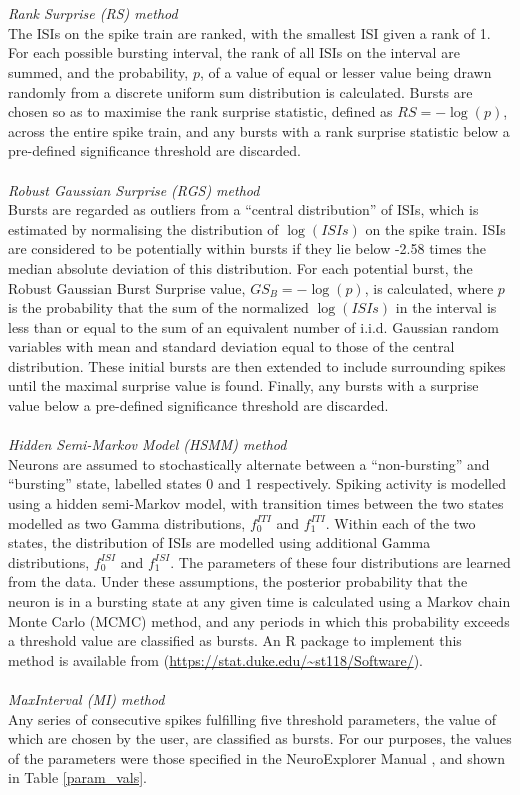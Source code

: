 \documentclass[12pt, titlepage]{article}
\begin{document}
	\\ \\ \textit{Rank Surprise (RS) method \cite{Gourevitch2007}}
	\\The ISIs on the spike train are ranked,  with the smallest ISI given a rank of 1. For each possible bursting interval, the rank of all ISIs on the interval are summed, and the probability, $p$, of a value of equal or lesser value  being drawn randomly from a discrete uniform sum distribution is calculated. Bursts are chosen so as to maximise the rank surprise statistic, defined as $RS=-\log(p)$, across the entire spike train, and any bursts with a rank surprise statistic below a pre-defined significance threshold are discarded\nocite{Gourevitch2007}. 
	\\ \\ \textit{Robust Gaussian Surprise (RGS) method \cite{Ko2012}}
	\\Bursts are regarded as outliers from a ``central distribution'' of ISIs, which is estimated by normalising the distribution of $\log(ISIs)$ on the spike train. ISIs are considered to be potentially within bursts if they lie below -2.58 times the median absolute deviation of this distribution. For each potential burst, the Robust Gaussian Burst Surprise value, $GS_B=-\log(p)$, is calculated, where $p$ is the probability that the sum of the normalized $\log(ISIs)$ in the interval is less than or equal to the sum of an equivalent number of i.i.d. Gaussian random variables with mean and standard deviation equal to those of the central distribution. These initial bursts are then extended to include surrounding spikes until the maximal surprise value is found. Finally, any bursts with a surprise value below a pre-defined significance threshold are discarded.
	\\ \\ \textit{Hidden Semi-Markov Model (HSMM) method \cite{Tokdar2010}}
	\\Neurons are assumed to stochastically alternate between a ``non-bursting'' and ``bursting'' state, labelled states 0 and 1 respectively. Spiking activity is modelled using a hidden semi-Markov model, with transition times between the two states modelled as two Gamma distributions,  $f_0^{ITI}$ and $f_1^{ITI}$.  Within each of the two states, the distribution of ISIs are modelled using additional Gamma distributions, $f_0^{ISI}$ and $f_1^{ISI}$. The parameters of these four distributions are learned from the data. Under these assumptions, the posterior probability that the neuron is in a bursting state at any given time is calculated using a Markov chain Monte Carlo (MCMC) method, and any periods in which this probability exceeds a threshold value are classified as bursts. An R package to implement this method is available from (\url{https://stat.duke.edu/~st118/Software/}).
	\\ \\ \textit{MaxInterval (MI) method  \cite{NEmanual}}
	\\Any series of consecutive spikes fulfilling five threshold parameters, the value of which are chosen by the user, are classified as bursts. For our purposes, the values of the parameters were those specified in the NeuroExplorer Manual \cite{NEmanual}, and shown in Table \ref{param_vals}.
\end{document}
